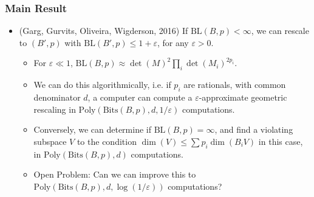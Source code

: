 \documentclass[usenames,dvipsnames,12pt]{beamer}
\begin{document}
\begin{frame}
    \frametitle{Main Result}

    \begin{itemize}
        \item (Garg, Gurvits, Oliveira, Wigderson, 2016) If $\text{BL}(B,p) < \infty$, we can rescale to $(B',p)$ with $\text{BL}(B',p) \leq 1 + \varepsilon$, for any $\varepsilon > 0$.
        \begin{itemize}
            \pause
            \item For $\varepsilon \ll 1$, $\text{BL}(B,p) \approx \det(M)^2 \prod\nolimits_i \det(M_i)^{2p_i}$.

            \pause
            \item We can do this algorithmically, i.e. if $p_i$ are rationals, with common denominator $d$, a computer can compute a $\varepsilon$-approximate geometric rescaling in $\text{Poly}(\text{Bits}(B,p),d,1/\varepsilon)$ computations. 

            \pause
            \item
            Conversely, we can determine if $\text{BL}(B,p) = \infty$, and find a violating subspace $V$ to the condition $\dim(V) \leq \sum p_i \dim(B_i V)$ in this case, in $\text{Poly}(\text{Bits}(B,p),d)$ computations.

            \pause
            \item Open Problem: Can we can improve this to $\text{Poly}(\text{Bits}(B,p),d,\log(1/\varepsilon))$ computations?
        \end{itemize}
    \end{itemize}
\end{frame}
\end{document}

